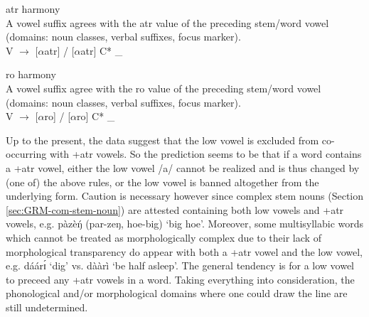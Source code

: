 \begin{Rule}\label{RULE-atr}{{\sc atr} harmony}\\
A vowel suffix agrees with the {\sc atr} value of   the preceding stem/word 
vowel (domains: noun classes, verbal suffixes, focus marker).\\
V $\rightarrow$ $[\alpha${\sc atr}$]$  / $[\alpha${\sc atr}$]$ C* \_
\end{Rule}


\begin{Rule}\label{RULE-ro}{{\sc ro} harmony}\\
A vowel suffix  agree with the {\sc ro} value of  the   preceding stem/word
 vowel (domains: noun classes, verbal suffixes, focus marker).\\
V $\rightarrow$ [$\alpha${\sc ro}]  / [$\alpha${\sc ro}] C* \_
\end{Rule}

Up to the present, the data suggest that the low vowel is excluded from 
co-occurring with {\sc +atr}  vowels.  So the prediction seems to be that if a 
word contains a {\sc +atr} vowel,  either the low vowel {/{\sls a}/} cannot be 
realized and is thus changed by (one of) the above rules, or  the  low vowel is 
banned  altogether from the underlying form. Caution is necessary however since 
complex stem nouns (Section \ref{sec:GRM-com-stem-noun}) are attested containing 
both  low vowels and {\sc +atr} vowels, e.g. {\sls pàzèŋ́} ({\sls par-zeŋ}, 
{\sc 
hoe-big})  `big hoe'. Moreover, some multisyllabic words which cannot be treated 
as morphologically complex  due to their lack of morphological transparency do 
appear with both  a {\sc +atr} vowel and  the low vowel, e.g. {\sls dáárɪ́}  
`dig' vs.  {\sls dààrì}  `be half asleep'. The general tendency is for a low 
vowel to preceed any {\sc +atr} vowels in a word. Taking everything into 
consideration, the phonological and/or morphological domains where one could 
draw the line are still undetermined.



